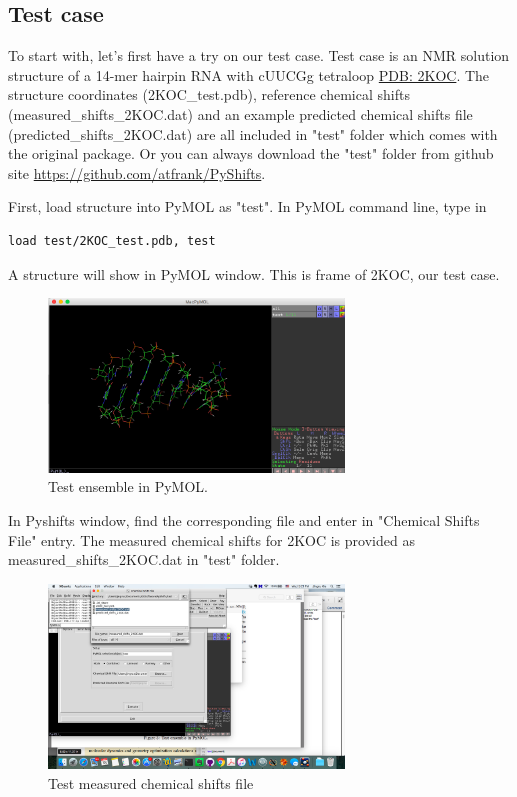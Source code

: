 \documentclass{article}
\begin{document}
\subsection{Test case}
To start with, let's first have a try on our test case. Test case is an NMR solution structure of a 14-mer hairpin RNA with cUUCGg tetraloop \href{http://www.rcsb.org/pdb/explore.do?structureId=2koc}{PDB: 2KOC}. The structure coordinates (2KOC\_test.pdb), reference chemical shifts (measured\_shifts\_2KOC.dat) and an example predicted chemical shifts file (predicted\_shifts\_2KOC.dat) are all included in "test" folder which comes with the original package. Or you can always download the "test" folder from github site \url{https://github.com/atfrank/PyShifts}.

First, load structure into PyMOL as "test". In PyMOL command line, type in
\begin{lstlisting}
load test/2KOC_test.pdb, test
\end{lstlisting}

A structure will show in PyMOL window. This is frame of 2KOC, our test case.
\begin{figure}[htbp]
\centering
\includegraphics[width=0.7\textwidth]{test_ensemble}
\caption{Test ensemble in PyMOL.}
\label{fig:test1}
\end{figure}

In Pyshifts window, find the corresponding file and enter in "Chemical Shifts File" entry. The measured chemical shifts for 2KOC is provided as measured\_shifts\_2KOC.dat in "test" folder. 
\begin{figure}[htbp]
\centering
\includegraphics[width=0.7\textwidth]{test2}
\caption{Test measured chemical shifts file}
\label{fig:test2}
\end{figure}
\end{document}
